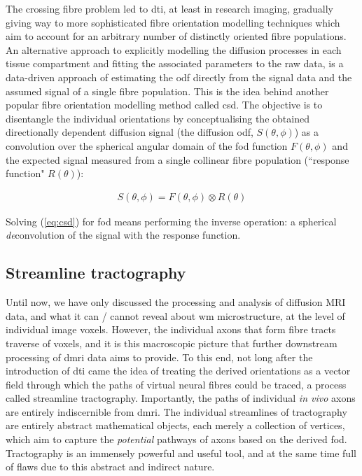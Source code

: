 The crossing fibre problem led to \gls{dti}, at least in research imaging, gradually giving way to more sophisticated fibre orientation modelling techniques which aim to account for an arbitrary number of distinctly oriented fibre populations.
An alternative approach to explicitly modelling the diffusion processes in each tissue compartment and fitting the associated parameters to the raw data, is a data-driven  approach of estimating the \gls{odf} directly from the signal data and the assumed signal of a single fibre population.
This is the idea behind another popular fibre orientation modelling method called \gls{csd}.
The objective is to disentangle the individual orientations by conceptualising the obtained directionally dependent diffusion signal (the diffusion \gls{odf}, $S(\theta,\phi)$) as a convolution over the spherical angular domain of the \gls{fod} function $F(\theta,\phi)$ and the expected signal measured from a single collinear fibre population (``response function" $R(\theta)$):

\begin{align}
  S(\theta,\phi) = F(\theta,\phi) \otimes R(\theta)
\end{align}\label{eq:csd}

Solving (\ref{eq:csd}) for \gls{fod} means performing the inverse operation: a spherical \textit{de}convolution of the signal with the response function.

\subsection{Streamline tractography}


Until now, we have only discussed the processing and analysis of diffusion MRI data, and what it can / cannot reveal about \gls{wm} microstructure, at the level of individual image \glspl{voxel}.
However, the individual axons that form fibre tracts traverse  of voxels, and it is this macroscopic picture that further downstream processing of \gls{dmri} data aims to provide.
To this end, not long after the introduction of \gls{dti} came the idea of treating the derived orientations as a vector field through which the paths of virtual neural fibres could be traced, a process called streamline tractography.
Importantly, the paths of individual \textit{in vivo} axons are entirely indiscernible from \gls{dmri}.
The individual streamlines of tractography are entirely abstract mathematical objects, each merely a collection of vertices, which aim to capture the \textit{potential} pathways of axons based on the derived \gls{fod}.
Tractography is an immensely powerful and useful tool, and at the same time full of flaws  due to this abstract and indirect nature.

